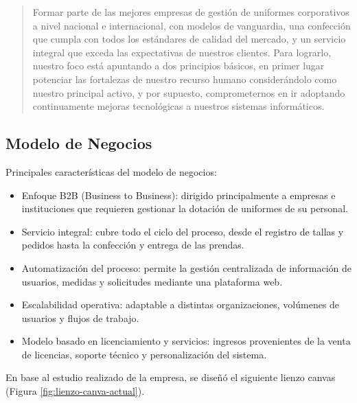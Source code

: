 \begin{quote}
    Formar parte de las mejores empresas de gestión de uniformes corporativos a nivel nacional e internacional, con modelos de vanguardia, una confección que cumpla con todos los estándares de calidad del mercado, y un servicio integral que exceda las expectativas de nuestros clientes. Para lograrlo, nuestro foco está apuntando a dos principios básicos, en primer lugar potenciar las fortalezas de nuestro recurso humano considerándolo como nuestro principal activo, y por supuesto, comprometernos en ir adoptando continuamente mejoras tecnológicas a nuestros sistemas informáticos.
\end{quote}

\subsection{Modelo de Negocios}


Principales características del modelo de negocios:

\begin{itemize}
    \item Enfoque B2B (Business to Business): dirigido principalmente a empresas e instituciones que requieren gestionar la dotación de uniformes de su personal.
    \item Servicio integral: cubre todo el ciclo del proceso, desde el registro de tallas y pedidos hasta la confección y entrega de las prendas.
    \item Automatización del proceso: permite la gestión centralizada de información de usuarios, medidas y solicitudes mediante una plataforma web.
    \item Escalabilidad operativa: adaptable a distintas organizaciones, volúmenes de usuarios y flujos de trabajo.
    \item Modelo basado en licenciamiento y servicios: ingresos provenientes de la venta de licencias, soporte técnico y personalización del sistema.
\end{itemize}

En base al estudio realizado de la empresa, se diseñó el siguiente lienzo canvas (Figura \ref{fig:lienzo-canva-actual}).

